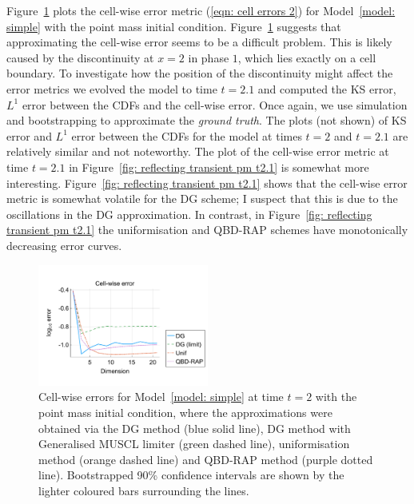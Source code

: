 Figure~\ref{fig: reflecting transient pm cp} plots the cell-wise error metric (\ref{eqn: cell errors 2}) for Model~\ref{model: simple} with the point mass initial condition. Figure~\ref{fig: reflecting transient pm cp} suggests that approximating the cell-wise error seems to be a difficult problem. This is likely caused by the discontinuity at \(x=2\) in phase \(1\), which lies exactly on a cell boundary. To investigate how the position of the discontinuity might affect the error metrics we evolved the model to time \(t=2.1\) and computed the KS error, \(L^1\) error between the CDFs and the cell-wise error. Once again, we use simulation and bootstrapping to approximate the \emph{ground truth}. The plots (not shown) of KS error and \(L^1\) error between the CDFs for the model at times \(t=2\) and \(t=2.1\) are relatively similar and not noteworthy. The plot of the cell-wise error metric at time \(t=2.1\) in Figure~\ref{fig: reflecting transient pm t2.1} is somewhat more interesting. Figure~\ref{fig: reflecting transient pm t2.1} shows that the cell-wise error metric is somewhat volatile for the DG scheme; I suspect that this is due to the oscillations in the DG approximation. In contrast, in Figure~\ref{fig: reflecting transient pm t2.1} the uniformisation and QBD-RAP schemes have monotonically decreasing error curves.
\begin{figure}[h]
	\centering
	\includegraphics[width=0.5\textwidth,trim={0.75cm 0.8cm 0.25cm 1.25cm},clip]{chapter6/figs/hitting_times_model/reflecting_model/transient_distribution/point_mass/L1_cell_probs_error_formatted.pdf}
	\caption{Cell-wise errors for Model~\ref{model: simple} at time \(t=2\) with the point mass initial condition, where the approximations were obtained via the DG method (blue solid line), DG method with Generalised MUSCL limiter (green dashed line), uniformisation method (orange dashed line) and QBD-RAP method (purple dotted line). Bootstrapped 90\% confidence intervals are shown by the lighter coloured bars surrounding the lines.} 
	\label{fig: reflecting transient pm cp} 
\end{figure}%
